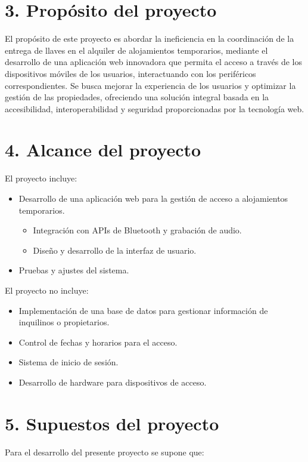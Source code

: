 \documentclass[
11pt, %
codirector, %
]{charter}
\begin{document}
\section{3. Propósito del proyecto}
\label{sec:proposito}

El propósito de este proyecto es abordar la ineficiencia en la coordinación de la entrega de llaves en el alquiler de alojamientos temporarios, mediante el desarrollo de una aplicación web innovadora que permita el acceso a través de los dispositivos móviles de los usuarios, interactuando con los periféricos correspondientes. Se busca mejorar la experiencia de los usuarios y optimizar la gestión de las propiedades, ofreciendo una solución integral basada en la accesibilidad, interoperabilidad y seguridad proporcionadas por la tecnología web.
\newpage
\section{4. Alcance del proyecto}
\label{sec:alcance}

El proyecto incluye:
\begin{itemize}
	\item Desarrollo de una aplicación web para la gestión de acceso a alojamientos temporarios.
        \begin{itemize}
    		\item Integración con APIs de Bluetooth y grabación de audio.
    		\item Diseño y desarrollo de la interfaz de usuario.
        \end{itemize}
	\item Pruebas y ajustes del sistema.
\end{itemize}

El proyecto no incluye:
\begin{itemize}
	\item Implementación de una base de datos para gestionar información de inquilinos o propietarios.
        \item Control de fechas y horarios para el acceso.
        \item Sistema de inicio de sesión.
	\item Desarrollo de hardware para dispositivos de acceso.
\end{itemize}

\section{5. Supuestos del proyecto}
\label{sec:supuestos}
Para el desarrollo del presente proyecto se supone que:
\end{document}
